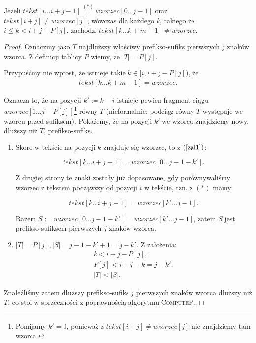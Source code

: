 \begin{lemma}
	\label{lemmakmp}
	Jeżeli $tekst[i\dots i+j-1] \mathrel{\overset{(\ast)}{=}} wzorzec[0 \dots j-1]$ oraz $tekst[i + j] \neq wzorzec[j]$, wówczas dla każdego $k$, takiego że $i \leq k < i + j - P[j]$, zachodzi $tekst[k \dots k + m - 1] \neq wzorzec$.
	\begin{proof}
		Oznaczmy jako $T$ najdłuższy właściwy prefikso-sufiks pierwszych $j$ znaków wzorca. Z definicji tablicy $P$ wiemy, że $|T|=P[j]$.
		
		Przypuśćmy nie wprost, że istnieje takie $k \in [i, i + j - P[j])$, że 
		\begin{gather}
			\label{zal1}
			tekst[k\dots k+m-1] = wzorzec.				
		\end{gather}

		Oznacza to, że na pozycji $k' := k - i$ istnieje pewien fragment ciągu $wzorzec[{1 \dots j - P[j]}]$\footnote{Pomijamy $k'=0$, ponieważ z $tekst[i+j] \neq wzorzec[j]$ nie znajdziemy tam wzorca.} równy $T$ (nieformalnie: podciąg równy $T$ występuje we wzorcu przed sufiksem).
		Pokażemy, że na pozycji $k'$ we wzorcu znajdziemy nowy, dłuższy niż $T$, prefikso-sufiks. 
		
		\begin{enumerate}
			\item Skoro w tekście na pozycji $k$ znajduje się wzorzec, to z $(\ref{zal1})$:
			 
			 $$tekst[k\dots i+j-1]=wzorzec[0\dots j-1-k'].$$ 
			 
			 Z drugiej strony te znaki zostały już dopasowane, gdy porównywaliśmy wzorzec z tekstem począwszy od pozycji $i$ w tekście, tzn. z $(\ast)$ mamy:
			 
			 $$tekst[k\dots i+j-1] = wzorzec[k' \dots j-1].$$
			 
			 Razem $S:=wzorzec[0\dots j-1-k']=wzorzec[k' \dots j-1]$, zatem $S$ jest prefikso-sufiksem pierwszych $j$ znaków wzorca.
			\item $|T|=P[j], |S| = j-1-k'+1=j-k'$. Z założenia: 
			\begin{gather*}
				k < i + j - P[j], \\
				P[j] < i + j - k = j - k', \\
				|T|<|S|.
			\end{gather*}
		\end{enumerate}
	
		Znaleźliśmy zatem dłuższy prefikso-sufiks $j$ pierwszych znaków wzorca dłuższy niż $T$, co stoi w sprzeczności z poprawnością algorytmu \textsc{ComputeP}. 
	\end{proof}
\end{lemma}

